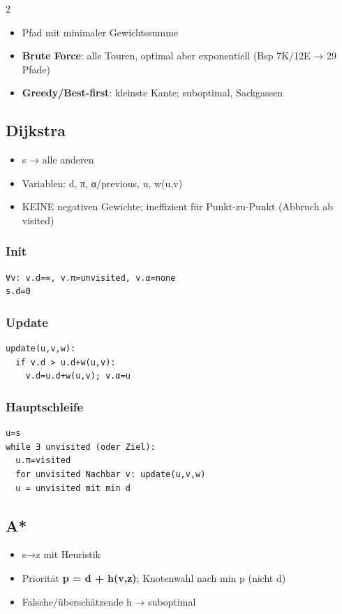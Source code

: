 \documentclass[10pt, a4paper]{article}
\begin{document}
\begin{multicols}{2}
\begin{itemize}
  \item Pfad mit minimaler Gewichtssumme
  \item \textbf{Brute Force}: alle Touren, optimal aber exponentiell (Bsp 7K/12E → 29 Pfade)
  \item \textbf{Greedy/Best-first}: kleinste Kante; suboptimal, Sackgassen
\end{itemize}


\subsection{Dijkstra}
\begin{itemize}
  \item s → alle anderen
  \item Variablen: d, π, α/previous, u, w(u,v)
  \item KEINE negativen Gewichte; ineffizient für Punkt-zu-Punkt (Abbruch ab visited)
\end{itemize}


\subsubsection{Init}
\begin{lstlisting}
∀v: v.d=∞, v.π=unvisited, v.α=none
s.d=0
\end{lstlisting}



\subsubsection{Update}
\begin{lstlisting}
update(u,v,w):
  if v.d > u.d+w(u,v):
    v.d=u.d+w(u,v); v.α=u
\end{lstlisting}



\subsubsection{Hauptschleife}
\begin{lstlisting}
u=s
while ∃ unvisited (oder Ziel):
  u.π=visited
  for unvisited Nachbar v: update(u,v,w)
  u = unvisited mit min d
\end{lstlisting}



\subsection{A*}
\begin{itemize}
  \item s→z mit Heuristik
  \item Priorität \textbf{p = d + h(v,z)}; Knotenwahl nach min p (nicht d)
  \item Falsche/überschätzende h → suboptimal
\end{itemize}



\end{multicols}
\end{document}
